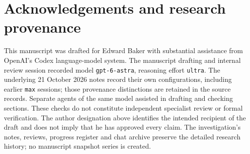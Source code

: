 \section*{Acknowledgements and research provenance}
This manuscript was drafted for Edward Baker with substantial assistance
from OpenAI's Codex language-model system. The manuscript drafting and
internal review session recorded model \texttt{gpt-6-astra}, reasoning
effort \texttt{ultra}. The underlying 21 October 2026 notes record their
own configurations, including earlier \texttt{max} sessions; those
provenance distinctions are retained in the source records. Separate
agents of the same model assisted in drafting and checking sections.
These checks do not constitute independent specialist review or formal
verification. The author designation above identifies the intended
recipient of the draft and does not imply that he has approved every
claim. The investigation's notes, reviews, progress register and chat
archive preserve the detailed research history; no manuscript snapshot
series is created.
